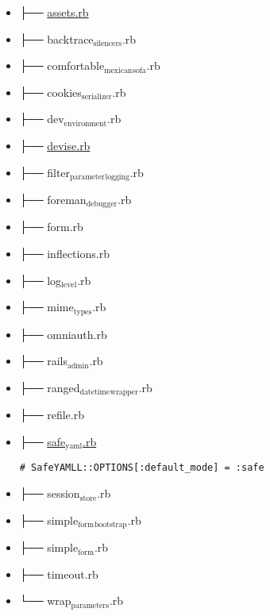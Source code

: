\documentclass[11pt]{article}
\begin{document}
\begin{itemize}
\item ├── \href{./config/initializers/assets.rb}{assets.rb}
\label{sec-1-4-6-1}
\item ├── backtrace$_{\text{silencers}}$.rb
\label{sec-1-4-6-2}
\item ├── comfortable$_{\text{mexican}}$$_{\text{sofa}}$.rb
\label{sec-1-4-6-3}
\item ├── cookies$_{\text{serializer}}$.rb
\label{sec-1-4-6-4}
\item ├── dev$_{\text{environment}}$.rb
\label{sec-1-4-6-5}
\item ├── \href{./config/initializers/devise.rb}{devise.rb}
\label{sec-1-4-6-6}
\item ├── filter$_{\text{parameter}}$$_{\text{logging}}$.rb
\label{sec-1-4-6-7}
\item ├── foreman$_{\text{debugger}}$.rb
\label{sec-1-4-6-8}
\item ├── form.rb
\label{sec-1-4-6-9}
\item ├── inflections.rb
\label{sec-1-4-6-10}
\item ├── log$_{\text{level}}$.rb
\label{sec-1-4-6-11}
\item ├── mime$_{\text{types}}$.rb
\label{sec-1-4-6-12}
\item ├── omniauth.rb
\label{sec-1-4-6-13}
\item ├── rails$_{\text{admin}}$.rb
\label{sec-1-4-6-14}
\item ├── ranged$_{\text{datetime}}$$_{\text{wrapper}}$.rb
\label{sec-1-4-6-15}
\item ├── refile.rb
\label{sec-1-4-6-16}
\item ├── \href{./config/initializers/safe_yaml.rb}{safe$_{\text{yaml}}$.rb}
\label{sec-1-4-6-17}

\begin{verbatim}
# SafeYAMLL::OPTIONS[:default_mode] = :safe
\end{verbatim}

\item ├── session$_{\text{store}}$.rb
\label{sec-1-4-6-18}
\item ├── simple$_{\text{form}}$$_{\text{bootstrap}}$.rb
\label{sec-1-4-6-19}
\item ├── simple$_{\text{form}}$.rb
\label{sec-1-4-6-20}
\item ├── timeout.rb
\label{sec-1-4-6-21}
\item └── wrap$_{\text{parameters}}$.rb
\label{sec-1-4-6-22}
\end{itemize}
\end{document}
